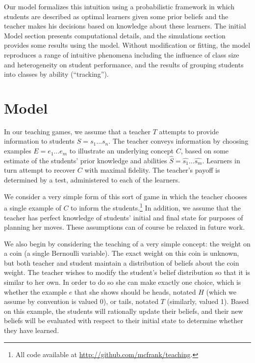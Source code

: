 \documentclass[10pt,letterpaper]{article}
\begin{document}
Our model formalizes this intuition using a probabilistic framework in which students are described as optimal learners given some prior beliefs and the teacher makes his decisions based on knowledge about these learners. The initial Model section presents computational details, and the simulations section provides some results using the model. Without modification or fitting, the model reproduces a range of intuitive phenomena including the influence of class size and heterogeneity on student performance, and the results of grouping students into classes by ability (``tracking''). 

\section{Model}

In our teaching games, we assume that a teacher $T$ attempts to provide information to students $S = {s_1 ... s_n}$. The teacher conveys information by choosing examples $E = {e_1 ... e_m}$ to illustrate an underlying concept $C$, based on some estimate of the students' prior knowledge and abilities $\hat{S} = {\hat{s_1} ... \hat{s_m}}$. Learners in turn attempt to recover $C$ with maximal fidelity. The teacher's payoff is determined by a test, administered to each of the learners. 

We consider a very simple form of this sort of game in which the teacher chooses a single example of $C$ to inform the students.\footnote{All code available at \url{http://github.com/mcfrank/teaching}.}
 In addition, we assume that the teacher has perfect knowledge of students' initial and final state for purposes of planning her moves. These assumptions can of course be relaxed in future work.

We also begin by considering the teaching of a very simple concept: the weight on a coin (a single Bernoulli variable). The exact weight on this coin is unknown, but both teacher and student maintain a distribution of beliefs about the coin weight. The teacher wishes to modify the student's belief distribution so that it is similar to her own. In order to do so she can make exactly one choice, which is whether the example $e$ that she shows should be heads, notated $H$ (which we assume by convention is valued 0), or tails, notated $T$ (similarly, valued 1). Based on this example, the students will rationally update their beliefs, and their new beliefs will be evaluated with respect to their initial state to determine whether they have learned.
\end{document}
